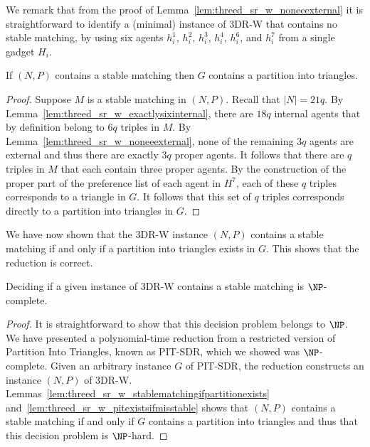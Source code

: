 We remark that from the proof of Lemma~\ref{lem:threed_sr_w_noneeexternal} it is straightforward to identify a (minimal) instance of 3DR-W that contains no stable matching, by using six agents $h_i^1$, $h_i^2$, $h_i^3$, $h_i^4$, $h_i^6$, and $h_i^7$ from a single gadget $H_i$.

\begin{lem}
\label{lem:threed_sr_w_pitexistsifmisstable}
If $(N, P)$ contains a stable matching then $G$ contains a partition into triangles.
\end{lem}
\begin{proof}
Suppose $M$ is a stable matching in $(N, P)$. Recall that $|N|=21q$. By Lemma~\ref{lem:threed_sr_w_exactlysixinternal}, there are $18q$ internal agents that by definition belong to $6q$ triples in $M$. By Lemma~\ref{lem:threed_sr_w_noneeexternal}, none of the remaining $3q$ agents are external and thus there are exactly $3q$ proper agents. It follows that there are $q$ triples in $M$ that each contain three proper agents. By the construction of the proper part of the preference list of each agent in $H^7$, each of these $q$ triples corresponds to a triangle in $G$. It follows that this set of $q$ triples corresponds directly to a partition into triangles in $G$.
\end{proof}

We have now shown that the 3DR-W instance $(N, P)$ contains a stable matching if and only if a partition into triangles exists in $G$. This shows that the reduction is correct.

\begin{thm}
\label{thm:threed_sr_w_existence}
Deciding if a given instance of 3DR-W contains a stable matching is $\NP$-complete.
\end{thm}
\begin{proof}
It is straightforward to show that this decision problem belongs to $\NP$. We have presented a polynomial-time reduction from a restricted version of Partition Into Triangles, known as PIT-SDR, which we showed was $\NP$-complete. Given an arbitrary instance $G$ of PIT-SDR, the reduction constructs an instance $(N, P)$ of 3DR-W. Lemmas~\ref{lem:threed_sr_w_stablematchingifpartitionexists} and~\ref{lem:threed_sr_w_pitexistsifmisstable} shows that $(N, P)$ contains a stable matching if and only if $G$ contains a partition into triangles and thus that this decision problem is $\NP$-hard.
\end{proof}